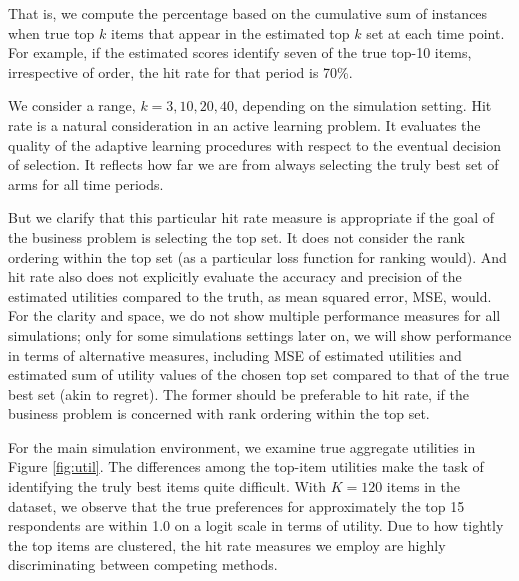 \documentclass[nonblindrev]{informs3}
\begin{document}
That is, we compute the percentage based on the cumulative sum of instances when true top $k$ items that appear in the estimated top $k$ set at each time point. For example, if the estimated scores identify seven of the true top-10 items, irrespective of order, the hit rate for that period is 70\%. 




We consider a range, $k=3,10,20,40$, depending on the simulation setting. Hit rate is a natural consideration in an active learning problem. It evaluates the quality of the adaptive learning procedures with respect to the eventual decision of selection. It reflects how far we are from always selecting the truly best set of arms for all time periods. 

But we clarify that this particular hit rate measure is appropriate if the goal of the business problem is selecting the top set. It does not consider the rank ordering within the top set (as a particular loss function for ranking would). And hit rate also does not explicitly evaluate the accuracy and precision of the estimated utilities compared to the truth, as mean squared error, MSE, would.  For the clarity and space, we do not show multiple performance measures for all simulations; only for some simulations settings later on, we will show performance in terms of alternative measures, including MSE of estimated utilities and estimated sum of utility values of the chosen top set compared to that of the true best set (akin to regret). The former should be preferable to hit rate, if the business problem is concerned with rank ordering within the top set.

For the main simulation environment, we examine true aggregate utilities in Figure \ref{fig:util}. The differences among the top-item utilities make the task of identifying the truly best items quite difficult. With $K=120$ items in the dataset, we observe that the true preferences for approximately the top 15 respondents are within 1.0 on a logit scale in terms of utility. Due to how tightly the top items are clustered, the hit rate measures we employ are highly discriminating between competing methods.
\end{document}
